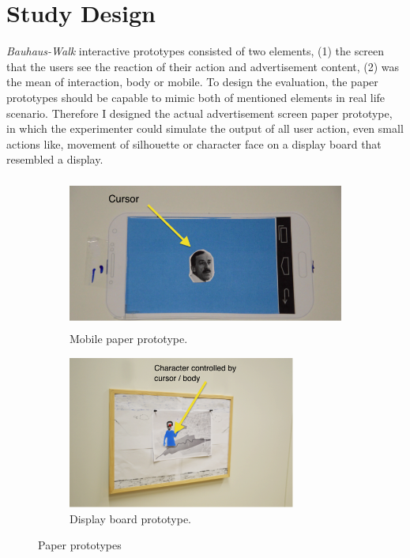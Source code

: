 \section{Study Design}
\emph{Bauhaus-Walk} interactive prototypes consisted of two elements, (1) the screen that the users see the reaction of their action and advertisement content, (2) was the mean of interaction, body or mobile. To design the evaluation, the paper prototypes should be capable to mimic both of mentioned elements in real life scenario. Therefore I designed the actual advertisement screen paper prototype, in which the experimenter could simulate the output of all user action, even small actions like, movement of silhouette or character face on a display board that resembled a display.

\begin{figure}[H]
    \centering
    \begin{subfigure}[H]{0.48\textwidth}
        \centering
        \includegraphics[width=\textwidth,height=5cm]{Figures/5/mobile_paper}
        \caption{Mobile paper prototype.}
        \label{fig:mobileproto}
    \end{subfigure}
    \begin{subfigure}[H]{0.48\textwidth}
        \centering
        \includegraphics[width=\textwidth,height=5cm]{Figures/5/paper_board}
        \caption{Display board prototype.}
        \label{fig:screen_proto}
    \end{subfigure}
    \caption{Paper prototypes}
    \label{fig:paper_prototype_screen}
\end{figure}


